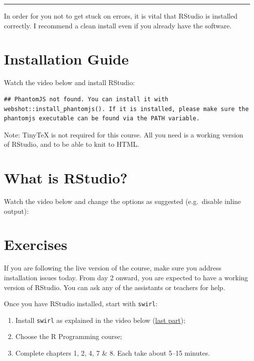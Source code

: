 \documentclass[
]{book}
\providecommand{\tightlist}{%
  \setlength{\itemsep}{0pt}\setlength{\parskip}{0pt}}
\begin{document}
\begin{center}\rule{0.5\linewidth}{0.5pt}\end{center}

In order for you not to get stuck on errors, it is vital that RStudio is installed correctly. I recommend a clean install even if you already have the software.

\hypertarget{installation-guide}{%
\section{Installation Guide}\label{installation-guide}}

Watch the video below and install RStudio:

\begin{verbatim}
## PhantomJS not found. You can install it with webshot::install_phantomjs(). If it is installed, please make sure the phantomjs executable can be found via the PATH variable.
\end{verbatim}

Note: TinyTeX is not required for this course. All you need is a working version of RStudio, and to be able to knit to HTML.

\hypertarget{what-is-rstudio}{%
\section{What is RStudio?}\label{what-is-rstudio}}

Watch the video below and change the options as suggested (e.g.~disable inline output):

\hypertarget{exercises}{%
\section{Exercises}\label{exercises}}

If you are following the live version of the course, make sure you address installation issues today. From day 2 onward, you are expected to have a working version of RStudio. You can ask any of the assistants or teachers for help.

Once you have RStudio installed, start with \texttt{swirl}:

\begin{enumerate}
\def\labelenumi{\arabic{enumi}.}
\tightlist
\item
  Install \texttt{swirl} as explained in the video below (\href{https://youtu.be/eKKil5iyxLM?t=148}{last part});
\item
  Choose the R Programming course;
\item
  Complete chapters 1, 2, 4, 7 \& 8. Each take about 5--15 minutes.
\end{enumerate}
\end{document}
